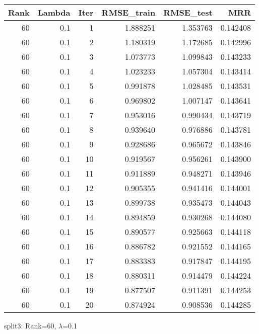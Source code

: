 \begin{tabular}{rrrrrr}
\toprule
 Rank &  Lambda &  Iter &  RMSE\_train &  RMSE\_test &       MRR \\
\midrule
   60 &     0.1 &     1 &    1.888251 &   1.353763 &  0.142408 \\
   60 &     0.1 &     2 &    1.180319 &   1.172685 &  0.142996 \\
   60 &     0.1 &     3 &    1.073773 &   1.099843 &  0.143233 \\
   60 &     0.1 &     4 &    1.023233 &   1.057304 &  0.143414 \\
   60 &     0.1 &     5 &    0.991878 &   1.028485 &  0.143531 \\
   60 &     0.1 &     6 &    0.969802 &   1.007147 &  0.143641 \\
   60 &     0.1 &     7 &    0.953016 &   0.990434 &  0.143719 \\
   60 &     0.1 &     8 &    0.939640 &   0.976886 &  0.143781 \\
   60 &     0.1 &     9 &    0.928686 &   0.965672 &  0.143846 \\
   60 &     0.1 &    10 &    0.919567 &   0.956261 &  0.143900 \\
   60 &     0.1 &    11 &    0.911889 &   0.948271 &  0.143946 \\
   60 &     0.1 &    12 &    0.905355 &   0.941416 &  0.144001 \\
   60 &     0.1 &    13 &    0.899738 &   0.935473 &  0.144043 \\
   60 &     0.1 &    14 &    0.894859 &   0.930268 &  0.144080 \\
   60 &     0.1 &    15 &    0.890577 &   0.925663 &  0.144118 \\
   60 &     0.1 &    16 &    0.886782 &   0.921552 &  0.144165 \\
   60 &     0.1 &    17 &    0.883383 &   0.917847 &  0.144195 \\
   60 &     0.1 &    18 &    0.880311 &   0.914479 &  0.144224 \\
   60 &     0.1 &    19 &    0.877507 &   0.911391 &  0.144253 \\
   60 &     0.1 &    20 &    0.874924 &   0.908536 &  0.144285 \\
\bottomrule
\end{tabular}

\caption{split3: Rank=60, $\lambda$=0.1}
